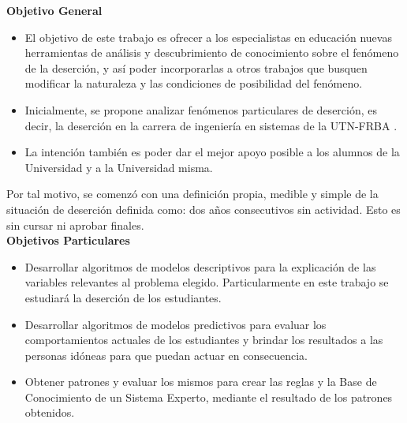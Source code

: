 
\textbf{Objetivo General}\\
\begin{itemize}
	\item El objetivo de este trabajo es ofrecer a los especialistas en educación nuevas herramientas de análisis y descubrimiento de conocimiento sobre el fenómeno de la deserción, y así poder incorporarlas a otros trabajos que busquen modificar la naturaleza y las condiciones de posibilidad del fenómeno.
	\item Inicialmente, se propone analizar fenómenos particulares de deserción, es decir, la deserción en la carrera de ingeniería en sistemas de la UTN-FRBA .
	\item La intención también es poder dar el mejor apoyo posible a los alumnos de la Universidad y a la Universidad misma.
\end{itemize}

Por tal motivo, se comenzó con una definición propia, medible y
simple de la situación de deserción definida como: dos años consecutivos sin actividad. Esto es sin cursar ni aprobar finales.\\



\textbf{Objetivos Particulares}
\begin{itemize}
	\item Desarrollar algoritmos de modelos descriptivos para la explicación de las variables relevantes al problema elegido. Particularmente en este trabajo se estudiará la deserción de los estudiantes.
	\item Desarrollar algoritmos de modelos predictivos para evaluar los comportamientos actuales de los estudiantes y brindar los resultados a las personas idóneas para que puedan actuar en consecuencia.
	\item Obtener patrones y evaluar los mismos para crear las reglas y la Base de Conocimiento de un Sistema Experto, mediante el resultado de los patrones obtenidos.
\end{itemize}




